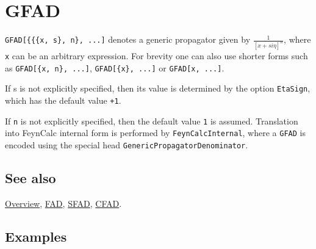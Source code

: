 \documentclass[../FeynCalcManual.tex]{subfiles}
\begin{document}
\hypertarget{gfad}{%
\section{GFAD}\label{gfad}}

\texttt{GFAD[\allowbreak{}\{\allowbreak{}\{\allowbreak{}\{\allowbreak{}x,\ \allowbreak{}s\},\ \allowbreak{}n\},\ \allowbreak{}...]}
denotes a generic propagator given by \(\frac{1}{[x + s i \eta]^n}\),
where \texttt{x} can be an arbitrary expression. For brevity one can
also use shorter forms such as
\texttt{GFAD[\allowbreak{}\{\allowbreak{}x,\ \allowbreak{}n\},\ \allowbreak{}...]},
\texttt{GFAD[\allowbreak{}\{\allowbreak{}x\},\ \allowbreak{}...]} or
\texttt{GFAD[\allowbreak{}x,\ \allowbreak{}...]}.

If s is not explicitly specified, then its value is determined by the
option \texttt{EtaSign}, which has the default value \texttt{+1}.

If \texttt{n} is not explicitly specified, then the default value
\texttt{1} is assumed. Translation into FeynCalc internal form is
performed by \texttt{FeynCalcInternal}, where a \texttt{GFAD} is encoded
using the special head \texttt{GenericPropagatorDenominator}.

\subsection{See also}

\hyperlink{toc}{Overview}, \hyperlink{fad}{FAD}, \hyperlink{sfad}{SFAD},
\hyperlink{cfad}{CFAD}.

\subsection{Examples}

\begin{Shaded}
\begin{Highlighting}[]
\OperatorTok{[} \OperatorTok{[}\OperatorTok{,} \OperatorTok{]}\OperatorTok{[}\OperatorTok{,} \OperatorTok{]} \SpecialCharTok{+} \OperatorTok{[}\OperatorTok{,}\OperatorTok{]]} 
 
\OperatorTok{[}\SpecialCharTok{\%}\OperatorTok{]} 
 
\SpecialCharTok{\%} \SpecialCharTok{//}\SpecialCharTok{//} 
\end{Highlighting}
\end{Shaded}
\end{document}
